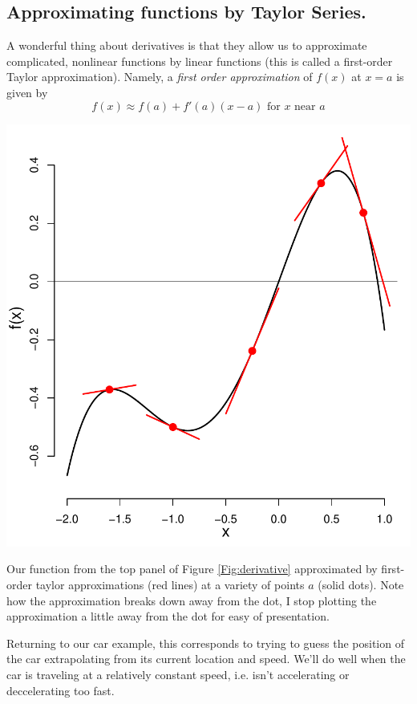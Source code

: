 \subsection{Approximating functions by Taylor Series.}
A wonderful thing about derivatives is that they allow us to approximate
complicated, nonlinear functions by linear functions (this is called a first-order
  Taylor approximation). Namely, a
\emph{first order approximation} of $f(x)$ at $x=a$ is given by 
\begin{equation}
  f(x) \approx f(a)+f'(a)(x-a) \mbox{ for $x$ near $a$}
  \end{equation}
 \begin{marginfigure}
 \begin{center}
   \includegraphics[width=\textwidth]{math_background/calc_pics/Taylor_1.pdf}\end{center}
 \caption{Our function from the top panel of Figure
   \ref{Fig:derivative} approximated by first-order taylor
   approximations (red lines) at a variety of points $a$ (solid
   dots). Note how the approximation breaks down away from the dot, I
   stop plotting the approximation a little away from the dot for easy
   of presentation. }\label{FigTaylor_1}
\end{marginfigure}
Returning to our car example, this corresponds to trying to guess the
position of the car
extrapolating from its current location and speed. We'll do well when
the car is traveling at a relatively constant speed, i.e. isn't
accelerating or deccelerating too fast. 

